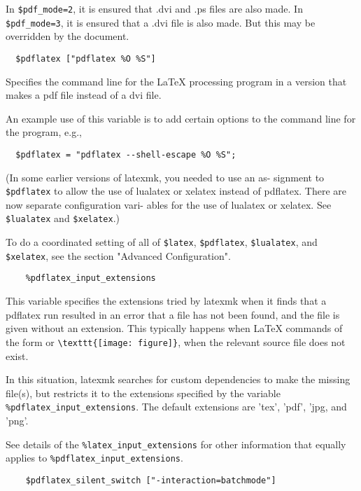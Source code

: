 In  \verb|$pdf_mode=2|,  it is ensured that .dvi and .ps files are also
made.  In \verb|$pdf_mode=3|, it is ensured that a .dvi  file  is  also
made.  But this may be overridden by the document.

\begin{verbatim}
  $pdflatex ["pdflatex %O %S"]
\end{verbatim}

Specifies the command line for the LaTeX processing program in a
version that makes a pdf file instead of a dvi file.

An example use of this variable is to add certain options to the
command line for the program, e.g.,

\begin{verbatim}
  $pdflatex = "pdflatex --shell-escape %O %S";
\end{verbatim}

(In  some  earlier versions of latexmk, you needed to use an as-
signment to \verb|$pdflatex| to allow the use of  lualatex  or  xelatex
instead of pdflatex.  There are now separate configuration vari-
ables for the use of lualatex or  xelatex.   See  \verb|$lualatex|  and
\verb|$xelatex|.)

To do a coordinated setting of all of \verb|$latex|, \verb|$pdflatex|,
\verb|$lualatex|, and \verb|$xelatex|, see the section "Advanced
Configuration".

\begin{verbatim}
	%pdflatex_input_extensions
\end{verbatim}

This variable specifies the extensions tried by latexmk when  it finds  that  a
pdflatex run resulted in an error that a file has not been found, and the file
is  given  without  an  extension.  This  typically  happens  when  LaTeX
commands of the form \verb|| or \verb|\texttt{[image: figure]}|,
when the relevant  source file does not exist.

In  this  situation, latexmk searches for custom dependencies to make the
missing file(s), but restricts  it  to  the  extensions specified  by  the
variable \verb|%pdflatex_input_extensions|.  The default extensions are 'tex',
'pdf', 'jpg, and 'png'.

See details of the \verb|%latex_input_extensions| for other information that equally
applies to \verb|%pdflatex_input_extensions|.

\begin{verbatim}
	$pdflatex_silent_switch ["-interaction=batchmode"]
\end{verbatim}

